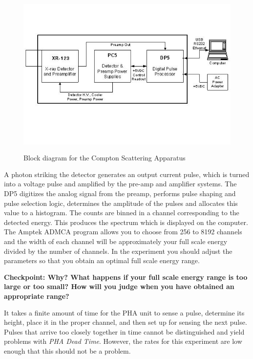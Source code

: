 \documentclass{../lab}
\begin{document}
\begin{figure}
    \centering
    \href{http://experimentationlab.berkeley.edu/sites/default/files/images/COMimage01.jpg}{\includegraphics[width=0.7\linewidth]{images/COMimage01.jpg}}
    \caption{Block diagram for the Compton Scattering Apparatus}
    \label{COMimage01}
\end{figure}

A photon striking the detector generates an output current pulse, which is turned into a voltage pulse and amplified by the pre-amp and amplifier systems. The DP5 digitizes the analog signal from the preamp, performs pulse shaping and pulse selection logic, determines the amplitude of the pulses and allocates this value to a histogram. The counts are binned in a channel corresponding to the detected energy. This produces the spectrum which is displayed on the computer. The Amptek ADMCA program allows you to choose from 256 to 8192 channels and the width of each channel will be approximately your full scale energy divided by the number of channels. In the experiment you should adjust the parameters so that you obtain an optimal full scale energy range. 

\textbf{Checkpoint: Why? What happens if your full scale energy range is too large or too small? How will you judge when you have obtained an appropriate range?}

It takes a finite amount of time for the PHA unit to sense a pulse, determine its height, place it in the proper channel, and then set up for sensing the next pulse. Pulses that arrive too closely together in time cannot be distinguished and yield problems with \emph{PHA Dead Time}. However, the rates for this experiment are low enough that this should not be a problem.
\end{document}
